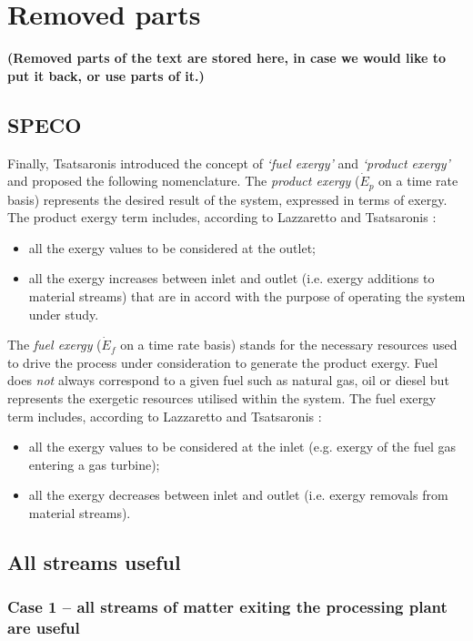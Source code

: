 \section{Removed parts}

\textbf{(Removed parts of the text are stored here, in case we would like to put it back, or use parts of it.)}

\subsection{SPECO}
Finally, Tsatsaronis \cite{BejanAdrian;TsatsaronisGeorge;Moran1996,Tsatsaronis2007} introduced the concept of \emph{`fuel exergy'} and \emph{`product exergy'} and proposed the following nomenclature. The \emph{product exergy} ($\dot{E}_p$ on a time rate basis) represents the desired result of the system, expressed in terms of exergy. The product exergy term includes, according to Lazzaretto and Tsatsaronis \cite{Lazzaretto1999,Lazzaretto2006}:
	\begin{itemize}
		\item all the exergy values to be considered at the outlet;
		\item all the exergy increases between inlet and outlet (i.e. exergy additions to material streams) that are in accord with the purpose of operating the system under study.
	\end{itemize}
The \emph{fuel exergy} ($\dot{E}_f$ on a time rate basis) stands for the necessary resources used to drive the process under consideration to generate the product exergy. Fuel does \emph{not} always correspond to a given fuel such as natural gas, oil or diesel but represents the exergetic resources utilised within the system. The fuel exergy term includes, according to Lazzaretto and Tsatsaronis \cite{Lazzaretto1999,Lazzaretto2006}:
		\begin{itemize}
			\item all the exergy values to be considered at the inlet (e.g. exergy of the fuel gas entering a gas turbine);
			\item all the exergy decreases between inlet and outlet (i.e. exergy removals from material streams).
		\end{itemize}
		
		
		
\subsection{All streams useful}		
\subsubsection{Case 1 -- all streams of matter exiting the processing plant are useful}
 
